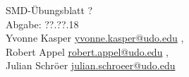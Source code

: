 


\begin{center}
{\huge SMD-Übungsblatt ?} \\
\vspace{1cm}
Abgabe: ??.??.18 \\
\vspace{.5cm}
  Yvonne Kasper
  \texorpdfstring{
    \href{mailto:authorA@udo.edu}{yvonne.kasper@udo.edu}
  }{},\\
  Robert Appel%
  \texorpdfstring{
    \href{mailto:authorB@udo.edu}{robert.appel@udo.edu}
  }{},\\
  Julian Schröer%
  \texorpdfstring{
    \href{mailto:authorB@udo.edu}{julian.schroeer@udo.edu}
  }{}
\end{center}




\printbibliography



